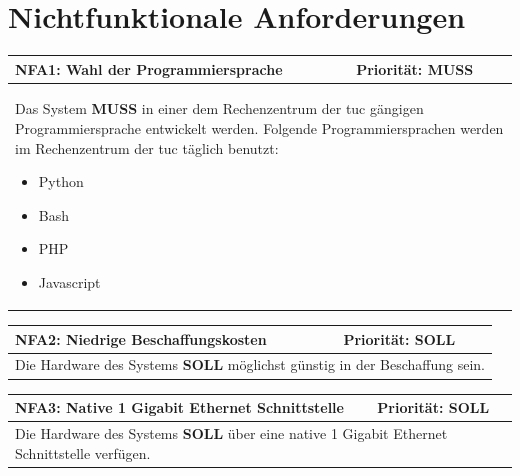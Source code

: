 \documentclass[titlepage]{report}
\begin{document}
\section*{Nichtfunktionale Anforderungen}
\begin{center}
\begin{tabular}{p{}>{\raggedleft\arraybackslash}p{}}\toprule
    \textbf{NFA1: Wahl der Programmiersprache} & \textbf{Priorität: MUSS} \\\midrule
	\multicolumn{2}{p{\textwidth-\tabcolsep}}{%
        Das System \textbf{MUSS} in einer dem Rechenzentrum der
        \gls{tuc} gängigen Programmiersprache entwickelt werden.
        Folgende Programmiersprachen werden im Rechenzentrum der
        \gls{tuc} täglich benutzt:
        \begin{itemize}
            \item Python
            \item Bash
            \item PHP
            \item Javascript
        \end{itemize}
    }\\\bottomrule
\end{tabular}
\end{center}
\begin{center}
\begin{tabular}{p{}>{\raggedleft\arraybackslash}p{}}\toprule
    \textbf{NFA2: Niedrige Beschaffungskosten} & \textbf{Priorität: SOLL} \\\midrule
	\multicolumn{2}{p{\textwidth-\tabcolsep}}{%
    Die Hardware des Systems \textbf{SOLL} möglichst günstig in der Beschaffung
    sein.
    }\\\bottomrule
\end{tabular}
\end{center}
\begin{center}
\begin{tabular}{p{}>{\raggedleft\arraybackslash}p{}}\toprule
    \textbf{NFA3: Native 1 Gigabit Ethernet Schnittstelle} & \textbf{Priorität: SOLL} \\\midrule
	\multicolumn{2}{p{\textwidth-\tabcolsep}}{%
    Die Hardware des Systems \textbf{SOLL} über eine native 1 Gigabit
    Ethernet Schnittstelle verfügen.
    }\\\bottomrule
\end{tabular}
\end{center}
\end{document}

